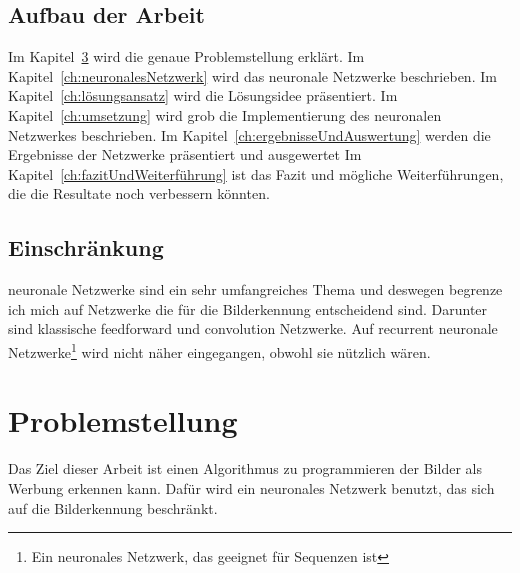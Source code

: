 \documentclass[12pt,a4paper]{report}
\begin{document}
\section{Aufbau der Arbeit}
\label{sec:aufbauDerArbeit}
Im Kapitel~\ref{ch:problemstellung} wird die genaue Problemstellung erklärt.
Im Kapitel~\ref{ch:neuronalesNetzwerk} wird das neuronale Netzwerke beschrieben.
Im Kapitel~\ref{ch:lösungsansatz} wird die Lösungsidee präsentiert.
Im Kapitel~\ref{ch:umsetzung} wird grob die Implementierung des neuronalen Netzwerkes beschrieben.
Im Kapitel~\ref{ch:ergebnisseUndAuswertung} werden die Ergebnisse der Netzwerke präsentiert und ausgewertet
Im Kapitel~\ref{ch:fazitUndWeiterführung} ist das Fazit und mögliche Weiterführungen, die die Resultate noch verbessern könnten.



\section{Einschränkung}
neuronale Netzwerke sind ein sehr umfangreiches Thema und deswegen begrenze ich mich auf Netzwerke die für die Bilderkennung entscheidend sind.
Darunter sind klassische feedforward und convolution Netzwerke.
Auf recurrent neuronale Netzwerke\footnote{Ein neuronales Netzwerk, das geeignet für Sequenzen ist\cite{wiki:rnn}} wird nicht näher eingegangen,
obwohl sie nützlich wären.


\chapter{Problemstellung}\label{ch:problemstellung}
Das Ziel dieser Arbeit ist einen Algorithmus zu programmieren der Bilder als Werbung erkennen kann.
Dafür wird ein neuronales Netzwerk benutzt, das sich auf die Bilderkennung beschränkt.
\end{document}
